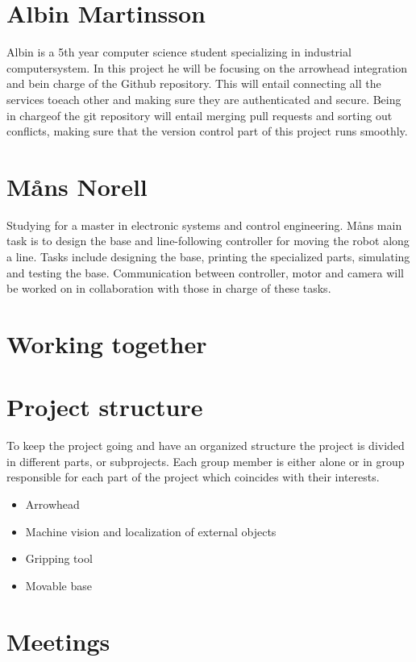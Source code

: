 \section*{Albin Martinsson}
Albin is a 5th year computer science student specializing in industrial computersystem. 
In this project he will be focusing on the arrowhead integration and bein charge of the Github repository.  
This will entail connecting all the services toeach other and making sure they are authenticated and secure.  
Being in chargeof the git repository will entail merging pull requests and sorting out conflicts,
making sure that the version control part of this project runs smoothly.


\section*{Måns Norell}
Studying for a master in electronic systems and control engineering.
Måns main task is to design the base and line-following controller for moving the robot along a line. 
Tasks include designing the base, printing the specialized parts, simulating and testing the base.
Communication between controller, motor and camera will be worked on in collaboration with those in charge of these tasks. 


\section{Working together}
\section*{Project structure}
To keep the project going and have an organized structure the project is divided 
in different parts, or subprojects. Each group member is either alone or in group responsible for each part of the project which coincides with their interests. 
\begin{itemize}
    \item Arrowhead
    \item Machine vision and localization of external objects
    \item Gripping tool
    \item Movable base
\end{itemize}

\section*{Meetings}

